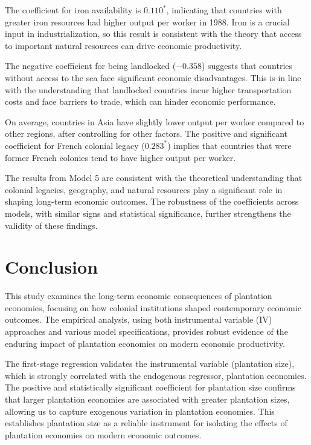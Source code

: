 \documentclass[12pt]{article}
\begin{document}
\noindent The coefficient for iron availability is \(0.110^*\), indicating that countries with greater iron resources had higher output per worker in 1988. Iron is a crucial input in industrialization, so this result is consistent with the theory that access to important natural resources can drive economic productivity.

\noindent The negative coefficient for being landlocked (\(-0.358\)) suggests that countries without access to the sea face significant economic disadvantages. This is in line with the understanding that landlocked countries incur higher transportation costs and face barriers to trade, which can hinder economic performance.

\noindent On average, countries in Asia have slightly lower output per worker compared to other regions, after controlling for other factors. The positive and significant coefficient for French colonial legacy (\(0.283^*\)) implies that countries that were former French colonies tend to have higher output per worker. 

\noindent The results from Model 5 are consistent with the theoretical understanding that colonial legacies, geography, and natural resources play a significant role in shaping long-term economic outcomes. The robustness of the coefficients across models, with similar signs and statistical significance, further strengthens the validity of these findings.

\newpage

\section{Conclusion}

\noindent This study examines the long-term economic consequences of plantation economies, focusing on how colonial institutions shaped contemporary economic outcomes. The empirical analysis, using both instrumental variable (IV) approaches and various model specifications, provides robust evidence of the enduring impact of plantation economies on modern economic productivity.

\noindent The first-stage regression validates the instrumental variable (plantation size), which is strongly correlated with the endogenous regressor, plantation economies. The positive and statistically significant coefficient for plantation size confirms that larger plantation economies are associated with greater plantation sizes, allowing us to capture exogenous variation in plantation economies. This establishes plantation size as a reliable instrument for isolating the effects of plantation economies on modern economic outcomes.
\end{document}
